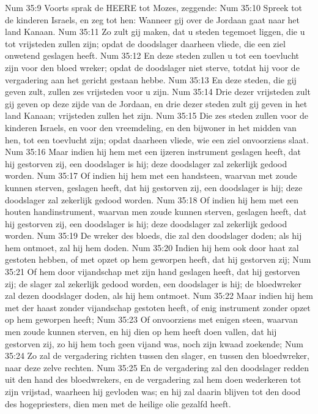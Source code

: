Num 35:9  Voorts sprak de HEERE tot Mozes, zeggende:
Num 35:10  Spreek tot de kinderen Israels, en zeg tot hen: Wanneer gij over de Jordaan gaat naar het land Kanaan.
Num 35:11  Zo zult gij maken, dat u steden tegemoet liggen, die u tot vrijsteden zullen zijn; opdat de doodslager daarheen vliede, die een ziel onwetend geslagen heeft.
Num 35:12  En deze steden zullen u tot een toevlucht zijn voor den bloed wreker; opdat de doodslager niet sterve, totdat hij voor de vergadering aan het gericht gestaan hebbe.
Num 35:13  En deze steden, die gij geven zult, zullen zes vrijsteden voor u zijn.
Num 35:14  Drie dezer vrijsteden zult gij geven op deze zijde van de Jordaan, en drie dezer steden zult gij geven in het land Kanaan; vrijsteden zullen het zijn.
Num 35:15  Die zes steden zullen voor de kinderen Israels, en voor den vreemdeling, en den bijwoner in het midden van hen, tot een toevlucht zijn; opdat daarheen vliede, wie een ziel onvoorziens slaat.
Num 35:16  Maar indien hij hem met een ijzeren instrument geslagen heeft, dat hij gestorven zij, een doodslager is hij; deze doodslager zal zekerlijk gedood worden.
Num 35:17  Of indien hij hem met een handsteen, waarvan met zoude kunnen sterven, geslagen heeft, dat hij gestorven zij, een doodslager is hij; deze doodslager zal zekerlijk gedood worden.
Num 35:18  Of indien hij hem met een houten handinstrument, waarvan men zoude kunnen sterven, geslagen heeft, dat hij gestorven zij, een doodslager is hij; deze doodslager zal zekerlijk gedood worden.
Num 35:19  De wreker des bloeds, die zal den doodslager doden; als hij hem ontmoet, zal hij hem doden.
Num 35:20  Indien hij hem ook door haat zal gestoten hebben, of met opzet op hem geworpen heeft, dat hij gestorven zij;
Num 35:21  Of hem door vijandschap met zijn hand geslagen heeft, dat hij gestorven zij; de slager zal zekerlijk gedood worden, een doodslager is hij; de bloedwreker zal dezen doodslager doden, als hij hem ontmoet.
Num 35:22  Maar indien hij hem met der haast zonder vijandschap gestoten heeft, of enig instrument zonder opzet op hem geworpen heeft;
Num 35:23  Of onvoorziens met enigen steen, waarvan men zoude kunnen sterven, en hij dien op hem heeft doen vallen, dat hij gestorven zij, zo hij hem toch geen vijand was, noch zijn kwaad zoekende;
Num 35:24  Zo zal de vergadering richten tussen den slager, en tussen den bloedwreker, naar deze zelve rechten.
Num 35:25  En de vergadering zal den doodslager redden uit den hand des bloedwrekers, en de vergadering zal hem doen wederkeren tot zijn vrijstad, waarheen hij gevloden was; en hij zal daarin blijven tot den dood des hogepriesters, dien men met de heilige olie gezalfd heeft.
